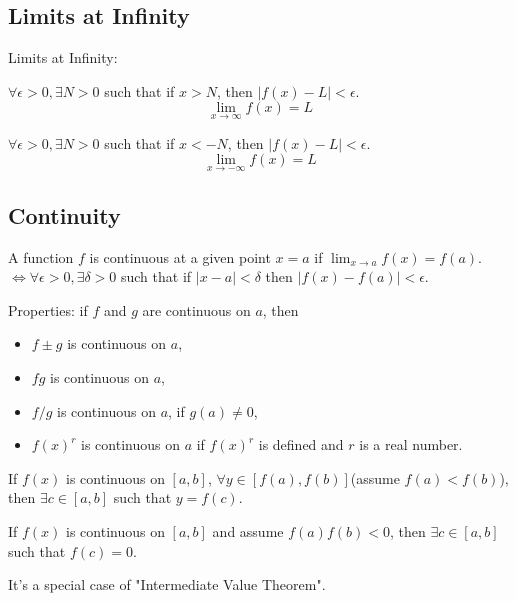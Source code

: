 \subsection{Limits at Infinity}

\begin{definition}Limits at Infinity:

    $\forall \epsilon > 0, \exists N > 0$ such that if $x > N$, then $|f(x) - L|< \epsilon$.
    \begin{equation*}
        \lim_{x \to \infty} f(x) = L
    \end{equation*}

    $\forall \epsilon > 0, \exists N > 0$ such that if $x < -N$, then $|f(x) - L|< \epsilon$.
    \begin{equation*}
        \lim_{x \to -\infty} f(x) = L
    \end{equation*}
\end{definition}

\subsection{Continuity}

\begin{definition}
    A function $f$ is continuous at a given point $x=a$ if $\lim_{x \to a} f(x) = f(a)$. $\iff \forall \epsilon > 0, \exists \delta > 0$ such that if $|x-a|<\delta$ then $|f(x) - f(a)| < \epsilon$.
\end{definition}

Properties: if $f$ and $g$ are continuous on $a$, then
\begin{itemize}
    \item $f \pm g$ is continuous on $a$,
    \item $fg$ is continuous on $a$,
    \item $f / g$ is continuous on $a$, if $g(a) \neq 0$,
    \item $f(x)^{r}$ is continuous on $a$ if $f(x)^{r}$ is defined and $r$ is a real number.
\end{itemize}


\begin{theorem}
    If $f(x)$ is continuous on $[a,b]$, $\forall y \in [f(a), f(b)]$(assume $f(a) < f(b)$), then $\exists c \in [a,b]$ such that $y=f(c)$.
\end{theorem}

\begin{theorem}
    If $f(x)$ is continuous on $[a,b]$ and assume $f(a)f(b)<0$, then $\exists c \in [a,b]$ such that $f(c) = 0$.
    \begin{remark*}
        It's a special case of "Intermediate Value Theorem".
    \end{remark*}
\end{theorem}


